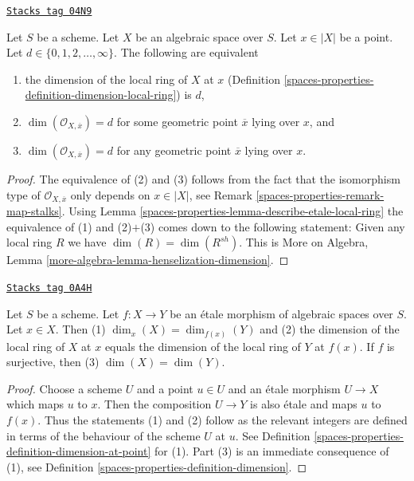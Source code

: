 \begin{lemma}
\label{spaces-properties-lemma-dimension-local-ring}
\href{https://stacks.math.columbia.edu/tag/04N9}{\texttt{Stacks tag 04N9}}

Let $S$ be a scheme. Let $X$ be an algebraic space over $S$.
Let $x \in |X|$ be a point. Let $d \in \{0, 1, 2, \ldots, \infty\}$.
The following are equivalent
\begin{enumerate}
\item the dimension of the local ring of $X$ at $x$
(Definition \ref{spaces-properties-definition-dimension-local-ring}) is $d$,
\item $\dim(\mathcal{O}_{X, \overline{x}}) = d$ for some geometric
point $\overline{x}$ lying over $x$, and
\item $\dim(\mathcal{O}_{X, \overline{x}}) = d$ for any geometric
point $\overline{x}$ lying over $x$.
\end{enumerate}
\end{lemma}

\begin{proof}
The equivalence of (2) and (3) follows from the fact that the
isomorphism type of $\mathcal{O}_{X, \overline{x}}$ only depends
on $x \in |X|$, see Remark \ref{spaces-properties-remark-map-stalks}.
Using Lemma \ref{spaces-properties-lemma-describe-etale-local-ring}
the equivalence of (1) and (2)$+$(3) comes down to the
following statement: Given any local ring $R$ we have
$\dim(R) = \dim(R^{sh})$. This is
More on Algebra, Lemma \ref{more-algebra-lemma-henselization-dimension}.
\end{proof}

\begin{lemma}
\label{spaces-properties-lemma-dimension-decent-invariant-under-etale}
\href{https://stacks.math.columbia.edu/tag/0A4H}{\texttt{Stacks tag 0A4H}}

Let $S$ be a scheme. Let $f : X \to Y$ be an \'etale morphism
of algebraic spaces over $S$. Let $x \in X$. Then
(1) $\dim_x(X) = \dim_{f(x)}(Y)$ and (2) the dimension of
the local ring of $X$ at $x$ equals the dimension of
the local ring of $Y$ at $f(x)$. If $f$ is surjective, then
(3) $\dim(X) = \dim(Y)$.
\end{lemma}

\begin{proof}
Choose a scheme $U$ and a point $u \in U$ and an \'etale morphism
$U \to X$ which maps $u$ to $x$. Then the composition $U \to Y$
is also \'etale and maps $u$ to $f(x)$. Thus the statements (1) and (2)
follow as the relevant integers are defined in terms of the behaviour
of the scheme $U$ at $u$. See
Definition \ref{spaces-properties-definition-dimension-at-point} for (1). Part (3) is
an immediate consequence of (1), see Definition \ref{spaces-properties-definition-dimension}.
\end{proof}

